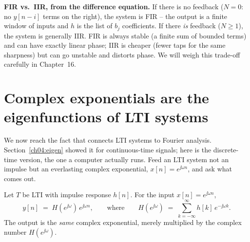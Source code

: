 \begin{focusbox}
\textbf{FIR vs.\ IIR, from the difference equation.} If there is no feedback
($N=0$: no $y[n-i]$ terms on the right), the system is FIR -- the output is a
finite window of inputs and $h$ is the list of $b_j$ coefficients. If
there \emph{is} feedback ($N\ge1$), the system is generally IIR. FIR is always
stable (a finite sum of bounded terms) and can have exactly linear phase; IIR is
cheaper (fewer taps for the same sharpness) but can go unstable and distorts
phase. We will weigh this trade-off carefully in Chapter~16.
\end{focusbox}

\section{Complex exponentials are the eigenfunctions of LTI systems}
\label{ch12:eigen}

We now reach the fact that connects LTI systems to Fourier analysis. Section~\ref{ch04:eigen} showed it for
continuous-time signals; here is the discrete-time version, the one a computer actually runs. Feed an LTI system not an impulse but an
everlasting complex exponential, $x[n]=e^{\jj\omega n}$, and ask what comes out.

\begin{theorem}
\label{ch12:thm-eigen}
Let $T$ be LTI with impulse response $h[n]$. For the input $x[n]=e^{\jj\omega n}$,
\[
  y[n] \;=\; H(e^{\jj\omega})\,e^{\jj\omega n},
  \qquad\text{where}\qquad
  H(e^{\jj\omega}) \;=\; \sum_{k=-\infty}^{\infty} h[k]\,e^{-\jj\omega k}.
\]
The output is the \emph{same} complex exponential, merely multiplied by the
complex number $H(e^{\jj\omega})$.
\end{theorem}


